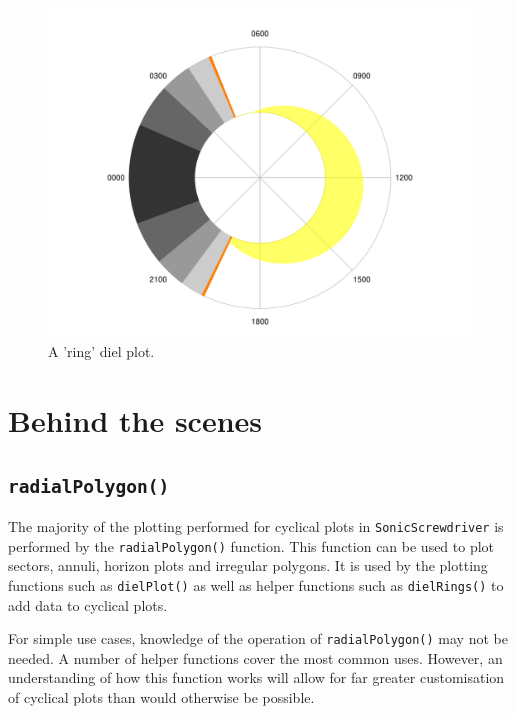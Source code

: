 \documentclass[
]{book}
\begin{document}
\begin{figure}

{\centering \includegraphics[width=0.9\linewidth]{_main_files/figure-latex/diel-plot-ring-1} 

}

\caption{A 'ring' diel plot.}\label{fig:diel-plot-ring}
\end{figure}

\hypertarget{behind-the-scenes}{%
\section{Behind the scenes}\label{behind-the-scenes}}

\hypertarget{radialpolygon}{%
\subsection{\texorpdfstring{\texttt{radialPolygon()}}{radialPolygon()}}\label{radialpolygon}}

The majority of the plotting performed for cyclical plots in \texttt{SonicScrewdriver} is performed by the \texttt{radialPolygon()} function. This function can be used to plot sectors, annuli, horizon plots and irregular polygons. It is used by the plotting functions such as \texttt{dielPlot()} as well as helper functions such as \texttt{dielRings()} to add data to cyclical plots.

For simple use cases, knowledge of the operation of \texttt{radialPolygon()} may not be needed. A number of helper functions cover the most common uses. However, an understanding of how this function works will allow for far greater customisation of cyclical plots than would otherwise be possible.
\end{document}
